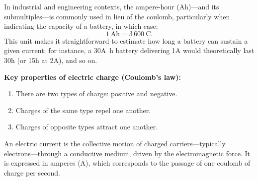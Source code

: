 \documentclass[11pt]{article}
\begin{document}
In industrial and engineering contexts, the ampere‑hour (Ah)—and its
submultiples—is commonly used in lieu of the coulomb, particularly
when indicating the capacity of a battery, in which case:
\[
  1~\unit{\ampere\hour} = 3\,600~\unit{\coulomb}.
\]
This unit makes it straightforward to estimate how long a battery can
sustain a given current; for instance, a 30\unit{\ampere\hour} battery
delivering 1\unit{\ampere}
would theoretically last 30\unit{\hour} (or 15\unit{\hour} at
2\unit{\ampere}), and so
on.

\textbf{Key properties of electric charge (Coulomb’s law):}
\begin{enumerate}
  \item There are two types of charge: positive and negative.
  \item Charges of the same type repel one another.
  \item Charges of opposite types attract one another.
\end{enumerate}

An electric current is the collective motion of charged
carriers—typically electrons—through a conductive medium, driven by
the electromagnetic force. It is expressed in amperes (\unit{\ampere}),
which corresponds to the passage of one coulomb of charge per
second.
\end{document}
